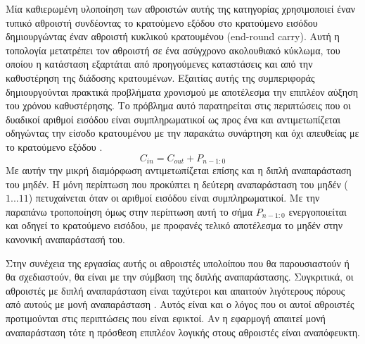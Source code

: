 Μία καθιερωμένη υλοποίηση των αθροιστών αυτής της κατηγορίας χρησιμοποιεί έναν τυπικό αθροιστή
συνδέοντας το κρατούμενο εξόδου στο κρατούμενο εισόδου δημιουργώντας έναν αθροιστή κυκλικού
κρατουμένου (end-round carry). Αυτή η τοπολογία μετατρέπει τον αθροιστή σε ένα ασύγχρονο 
ακολουθιακό κύκλωμα, του οποίου η κατάσταση εξαρτάται από προηγούμενες καταστάσεις και από την 
καθυστέρηση της διάδοσης κρατουμένων. Εξαιτίας αυτής της συμπεριφοράς δημιουργούνται
πρακτικά προβλήματα χρονισμού με αποτέλεσμα την επιπλέον αύξηση του χρόνου καθυστέρησης.
Το πρόβλημα αυτό παρατηρείται στις περιπτώσεις που οι δυαδικοί αριθμοί εισόδου 
είναι συμπληρωματικοί ως προς ένα και αντιμετωπίζεται οδηγώντας την είσοδο 
κρατουμένου με την παρακάτω συνάρτηση και όχι απευθείας με το κρατούμενο εξόδου \cite{1674817}.
\begin{equation}
    C_{in} = C_{out} + P_{n-1:0}
\end{equation}
Με αυτήν την μικρή διαμόρφωση αντιμετωπίζεται επίσης και η διπλή αναπαράσταση του μηδέν.
Η μόνη περίπτωση που προκύπτει η δεύτερη αναπαράσταση του μηδέν ($1...11$) πετυχαίνεται
όταν οι αριθμοί εισόδου είναι συμπληρωματικοί. Με την παραπάνω τροποποίηση όμως στην περίπτωση αυτή το σήμα $P_{n-1:0}$ ενεργοποιείται και οδηγεί το κρατούμενο εισόδου, 
με προφανές τελικό αποτέλεσμα το μηδέν στην κανονική αναπαράστασή του.

Στην συνέχεια της εργασίας αυτής οι αθροιστές υπολοίπου που θα παρουσιαστούν ή θα 
σχεδιαστούν, θα είναι με την σύμβαση της διπλής αναπαράστασης. Συγκριτικά, οι αθροιστές
με διπλή αναπαράσταση είναι ταχύτεροι και απαιτούν λιγότερους πόρους από αυτούς
με μονή αναπαράσταση \cite{298378}. Αυτός είναι και ο λόγος που οι αυτοί αθροιστές  
προτιμούνται στις περιπτώσεις που είναι εφικτοί. Αν η εφαρμογή απαιτεί μονή αναπαράσταση 
τότε η πρόσθεση επιπλέον λογικής στους αθροιστές είναι αναπόφευκτη.

















